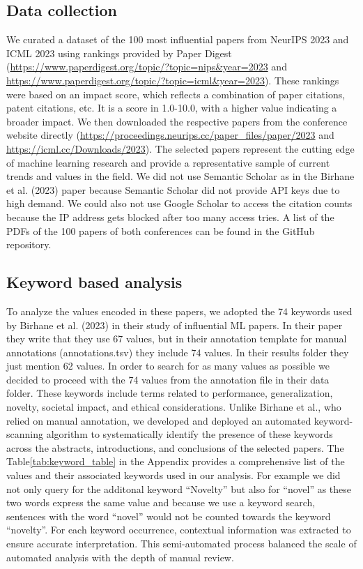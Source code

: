 \documentclass{article}
\begin{document}
\subsection{Data collection}
We curated a dataset of the 100 most influential papers from NeurIPS 2023 and ICML 2023 using rankings provided by Paper Digest 
(\url{https://www.paperdigest.org/topic/?topic=nips&year=2023} and \url{https://www.paperdigest.org/topic/?topic=icml&year=2023}). 
These rankings were based on an impact score, which reflects a combination of paper citations, patent citations, etc. It is a score in 1.0-10.0, 
with a higher value indicating a broader impact. We then downloaded the respective papers from the conference website directly 
(\url{https://proceedings.neurips.cc/paper_files/paper/2023} and \url{https://icml.cc/Downloads/2023}). 
The selected papers represent the cutting edge of machine 
learning research and provide a representative sample of current trends and values in the field. We did not use Semantic Scholar as in the Birhane et 
al. (2023) paper because Semantic Scholar did not provide API keys due to high demand. We could also not use Google Scholar to access the citation 
counts because the IP address gets blocked after too many access tries. A list of the PDFs of the 100 papers of both conferences can be found in the 
GitHub repository.

\subsection{Keyword based analysis}
To analyze the values encoded in these papers, we adopted the 74 keywords used by Birhane et al. (2023) in their study of influential ML papers. In their paper
they write that they use 67 values, but in their annotation template for manual annotations (annotations.tsv) they include 74 values. In their results folder they
just mention 62 values. In order to search for as many values as possible we decided to proceed with the 74 values from the annotation file in their data folder.  
These keywords include terms related to performance, generalization, novelty, societal impact, and ethical considerations. 
Unlike Birhane et al., who relied on manual annotation, we developed and deployed an automated keyword-scanning algorithm to systematically identify the presence of 
these keywords across the abstracts, introductions, and conclusions of the selected papers.
The Table\ref{tab:keyword_table} in the Appendix provides a comprehensive list of the values and their associated keywords used in our analysis.
For example we did not only query for the additonal keyword ``Novelty'' but also for ``novel'' as these two
words express the same value and because we use a keyword search, sentences with the word ``novel'' would not be counted towards the keyword ``novelty''.  
For each keyword occurrence, contextual information was extracted to ensure accurate interpretation. 
This semi-automated process balanced the scale of automated analysis with the depth of manual review.
\end{document}
